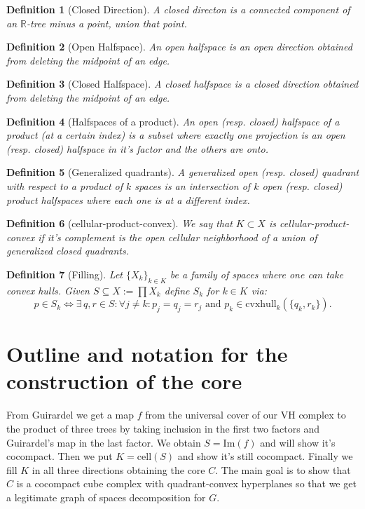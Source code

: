 \documentclass{article}
\theoremstyle{mystyle}
\newtheorem{defn}{Definition}
\theoremstyle{remark}
\begin{document}
\begin{defn}[Closed Direction] A closed directon is a connected component of an \(\mathbb{R}\)-tree minus a point, union that point.
\end{defn}
\begin{defn}[Open Halfspace] An open halfspace is an open direction obtained from deleting the midpoint of an edge.
\end{defn}
\begin{defn}[Closed Halfspace] A closed halfspace is a closed direction obtained from deleting the midpoint of an edge.
\end{defn}
\begin{defn}[Halfspaces of a product] An open (resp. closed) halfspace of a product (at a certain index) is a subset where exactly one projection is an open (resp. closed)  halfspace in it's factor and the others are onto.
\end{defn}
\begin{defn}[Generalized quadrants] A generalized open (resp. closed) quadrant with respect to a product of \(k\) spaces is an intersection of \(k\) open (resp. closed) product halfspaces where each one is at a different index.
\end{defn}
\begin{defn}[cellular-product-convex] We say that \(K \subset X\) is cellular-product-convex if it's complement is the open cellular neighborhood of a union of generalized closed quadrants.
\end{defn}

\begin{defn}
	[Filling]
    Let \(\{X_{k}\}_{k \in K}\) be a family of spaces where one can take convex hulls. Given \(S \subseteq X := \prod X_{k}\) define \(S_{k}\) for \(k \in K\) via: \[p \in S_{k} \iff \exists \,q,r \in S: \forall j \neq k: p_{j} = q_{j} = r_{j} \text{ and } p_{k} \in \text{cvxhull}_k (\{q_{k} , r_{k}\}).\] 
\end{defn}


\section{Outline and notation for the construction of the core}

    From Guirardel we get a map \(f\) from the universal cover of our VH complex to the product of three trees by taking inclusion in the first two factors and Guirardel's map in the last factor. We obtain \(S = \text{Im}(f)\) and will show it's cocompact. Then we put \(K = \text{cell}{(S)}\) and show it's still cocompact. Finally we fill \(K\) in all three directions obtaining the core \(C\). The main goal is to show that \(C\) is a cocompact cube complex with quadrant-convex hyperplanes so that we get a legitimate graph of spaces decomposition for \(G\).
\end{document}
